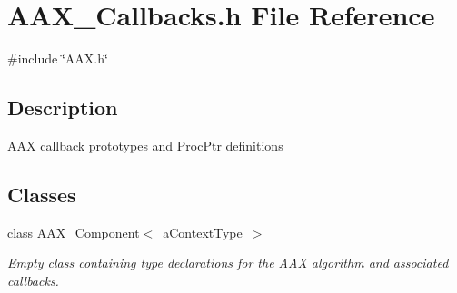 \hypertarget{a00401}{}\section{A\+A\+X\+\_\+\+Callbacks.\+h File Reference}
\label{a00401}
{\ttfamily \#include \char`\"{}A\+A\+X.\+h\char`\"{}}\newline


\subsection{Description}
A\+AX callback prototypes and Proc\+Ptr definitions 

\subsection*{Classes}
\begin{DoxyCompactItemize}
\item 
class \mbox{\hyperlink{a01437}{A\+A\+X\+\_\+\+Component$<$ a\+Context\+Type $>$}}
\begin{DoxyCompactList}\small\item\em Empty class containing type declarations for the A\+AX algorithm and associated callbacks. \end{DoxyCompactList}\end{DoxyCompactItemize}
